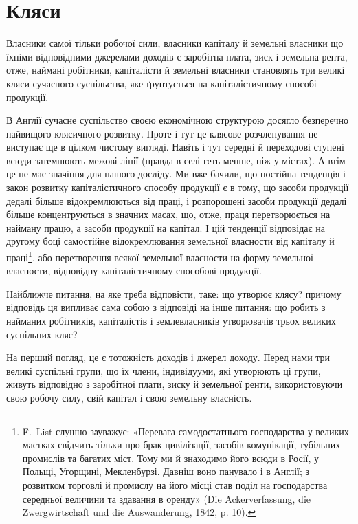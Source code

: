 

\section{Кляси}

Власники самої тільки робочої сили, власники капіталу й земельні власники
що їхніми відповідними джерелами доходів є заробітна плата, зиск і земельна рента,
отже, наймані робітники, капіталісти й земельні власники становлять три великі
кляси сучасного суспільства, яке ґрунтується на капіталістичному способі
продукції.

В Англії сучасне суспільство своєю економічною структурою досягло безперечно
найвищого клясичного розвитку. Проте і тут це клясове розчленування не
виступає ще в цілком чистому вигляді. Навіть і тут середні й переходові ступені
всюди затемнюють межові лінії (правда в селі геть менше, ніж у містах).
А втім це не має значіння для нашого досліду. Ми вже бачили, що постійна
тенденція і закон розвитку капіталістичного способу продукції є в тому, що
засоби продукції дедалі більше відокремлюються від праці, і розпорошені засоби
продукції дедалі більше концентруються в значних масах, що, отже, праця
перетворюється на найману працю, а засоби продукції на капітал. І цій тенденції
відповідає на другому боці самостійне відокремлювання земельної власности
від капіталу й праці\footnote{
F.~List слушно зауважує: «Перевага самодостатнього господарства у великих маєтках
свідчить тільки про брак цивілізації, засобів комунікації, тубільних промислів та багатих міст. Тому
ми й знаходимо його всюди в Росії, у Польщі, Угорщині, Мекленбурзі. Давніш воно панувало і в Англії;
з розвитком торговлі й промислу на його місці став поділ на господарства середньої величини та
здавання в оренду» (Die Ackerverfassung, die Zwergwirtschaft und die Auswanderung, 1842, p. 10).
}, або перетворення всякої земельної власности на форму
земельної власности, відповідну капіталістичному способові продукції.

Найближче питання, на яке треба відповісти, таке: що утворює клясу?
причому відповідь ця випливає сама собою з відповіді на інше питання: що
робить з найманих робітників, капіталістів і землевласників утворювачів трьох
великих суспільних кляс?

На перший погляд, це є тотожність доходів і джерел доходу. Перед нами
три великі суспільні групи, що їх члени, індивідууми, які утворюють ці групи,
живуть відповідно з заробітної плати, зиску й земельної ренти, використовуючи
свою робочу силу, свій капітал і свою земельну власність.

